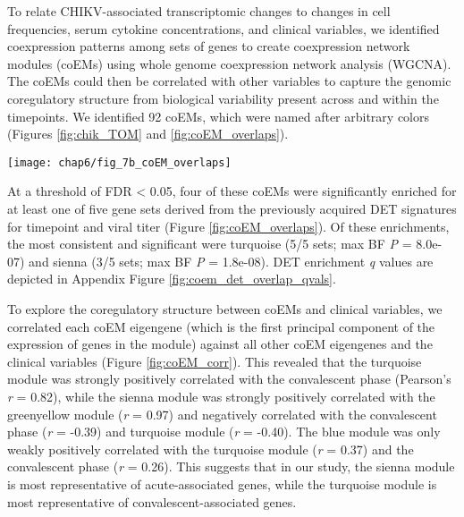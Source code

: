 To relate CHIKV-associated transcriptomic changes to changes in cell \subcommunity{} frequencies, serum cytokine concentrations, and clinical variables, we identified coexpression patterns among sets of genes to create coexpression network modules (coEMs) using whole genome coexpression network analysis (WGCNA).\autocite{Zhang2005} The coEMs could then be correlated with other variables to capture the genomic coregulatory structure from biological variability present across and within the timepoints. We identified 92 coEMs, which were named after arbitrary colors (Figures \ref{fig:chik_TOM} and \ref{fig:coEM_overlaps}). 
\begin{figure*}
  \centering
  \texttt{[image: chap6/fig\_7b\_coEM\_overlaps]}
  \caption[Enrichment of five subsets of the DET signatures in the coexpression modules]{
  \textbf{Enrichment of five subsets of the DET signatures for CHIKV infection phase and viral titer} (see Figures \ref{fig:DET_timepoint_volcano} and \ref{fig:DET_viral_volcano}) among each of the 92 coEMs (X axis), showing the fractional overlap of the module with the DET signature (Y axis). *\emph{q} < 0.05, ***\emph{q} < 0.001; \emph{q} values are Benjamini-Hochberg adjusted \emph{P} values (Appendix Figure \ref{fig:coem_det_overlap_qvals} shows \emph{q} values for all tests). The four coEMs highlighted in Figure \ref{fig:chik_TOM} have at least one significant DET signature enrichment.
  }
  \label{fig:coEM_overlaps}
\end{figure*}
At a threshold of FDR < 0.05, four of these coEMs were significantly enriched for at least one of five gene sets derived from the previously acquired DET signatures for timepoint and viral titer (Figure \ref{fig:coEM_overlaps}). Of these enrichments, the most consistent and significant were turquoise (5/5 sets; max BF \emph{P} = 8.0e-07) and sienna (3/5 sets; max BF \emph{P} = 1.8e-08). DET enrichment \emph{q} values are depicted in Appendix Figure \ref{fig:coem_det_overlap_qvals}.

To explore the coregulatory structure between coEMs and clinical variables, we correlated each coEM eigengene (which is the first principal component of the expression of genes in the module) against all other coEM eigengenes and the clinical variables (Figure \ref{fig:coEM_corr}). This revealed that the turquoise module was strongly positively correlated with the convalescent phase (Pearson’s \emph{r} = 0.82), while the sienna module was strongly positively correlated with the greenyellow module (\emph{r} = 0.97) and negatively correlated with the convalescent phase (\emph{r} = -0.39) and turquoise module (\emph{r} = -0.40). The blue module was only weakly positively correlated with the turquoise module (\emph{r} = 0.37) and the convalescent phase (\emph{r} = 0.26). This suggests that in our study, the sienna module is most representative of acute-associated genes, while the turquoise module is most representative of convalescent-associated genes.

